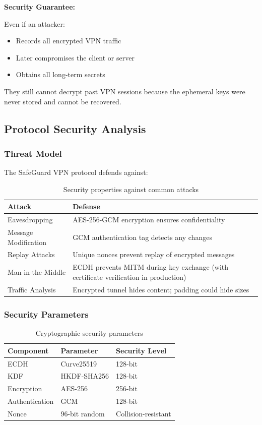 \documentclass[12pt,a4paper]{article}
\begin{document}
\textbf{Security Guarantee:}

Even if an attacker:
\begin{itemize}
    \item Records all encrypted VPN traffic
    \item Later compromises the client or server
    \item Obtains all long-term secrets
\end{itemize}

They still cannot decrypt past VPN sessions because the ephemeral keys were never stored and cannot be recovered.

\subsection{Protocol Security Analysis}

\subsubsection{Threat Model}

The SafeGuard VPN protocol defends against:

\begin{table}[H]
\centering
\begin{tabular}{@{}lp{9cm}@{}}
\toprule
\textbf{Attack} & \textbf{Defense} \\ \midrule
Eavesdropping & AES-256-GCM encryption ensures confidentiality \\
Message Modification & GCM authentication tag detects any changes \\
Replay Attacks & Unique nonces prevent replay of encrypted messages \\
Man-in-the-Middle & ECDH prevents MITM during key exchange (with certificate verification in production) \\
Traffic Analysis & Encrypted tunnel hides content; padding could hide sizes \\
\bottomrule
\end{tabular}
\caption{Security properties against common attacks}
\end{table}

\subsubsection{Security Parameters}

\begin{table}[H]
\centering
\begin{tabular}{@{}lll@{}}
\toprule
\textbf{Component} & \textbf{Parameter} & \textbf{Security Level} \\ \midrule
ECDH & Curve25519 & 128-bit \\
KDF & HKDF-SHA256 & 128-bit \\
Encryption & AES-256 & 256-bit \\
Authentication & GCM & 128-bit \\
Nonce & 96-bit random & Collision-resistant \\
\bottomrule
\end{tabular}
\caption{Cryptographic security parameters}
\end{table}
\end{document}
